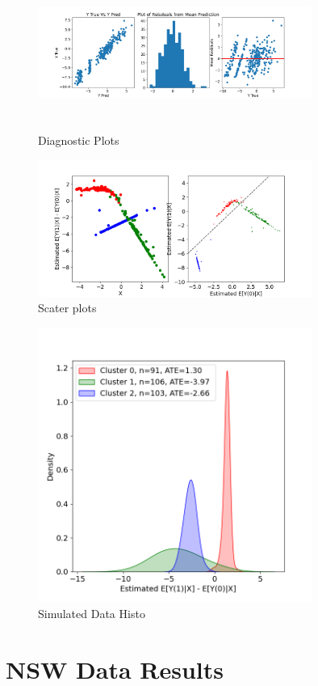 \documentclass{article}
\begin{document}
\begin{figure}[H]
  \centering
  \includegraphics[width=0.8\textwidth, height=5cm]{Plots/simuated_diagnostics.png}
  \caption{Diagnostic Plots}
  \label{fig:sim_diag_plots}
\end{figure}

\begin{figure}[H]
  \centering
  \includegraphics[width=0.8\textwidth]{Plots/Simulated_output_scatted.png}
  \caption{Scater plots}
  \label{fig:sim_scatter_plots}
\end{figure}

\begin{figure}[H]
  \centering
  \includegraphics[width=0.8\textwidth]{Plots/Simulated_output_histogram.png}
  \caption{Simulated Data Histo}
  \label{fig:sim_histo}
\end{figure}



\section{NSW Data Results}

\printbibliography
\end{document}

